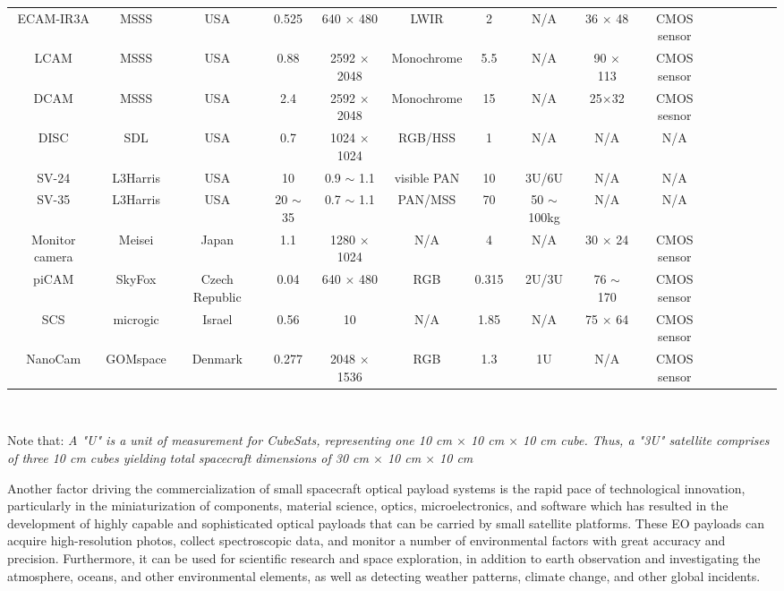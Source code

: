 \documentclass[final,5p,times,sort&compress,twocolumn]{elsarticle}
\begin{document}
\begin{table}
{\begin{tabular}{c c c c c c c c c c c c c c c}
			ECAM-IR3A & MSSS & USA & 0.525 & 640 $\times$ 480 &  LWIR & 2 &  N/A &  36 $\times$ 48 & CMOS sensor  & \cite{malin2023}\\    
			LCAM & MSSS & USA & 0.88 & 2592 $\times$ 2048 &  Monochrome & 5.5 &  N/A &90 $\times$ 113 & CMOS sensor & \cite{malin2023}\\  
			DCAM & MSSS & USA & 2.4 & 2592 $\times$ 2048 & Monochrome & 15 &  N/A & 25$\times$32 & CMOS  sesnor & \cite{malin2023}\\  
			DISC & SDL & USA & 0.7 & 1024 $\times$ 1024 &  RGB/HSS & 1 &  N/A & N/A & N/A & \cite{sdl2023}\\
			SV-24 & L3Harris & USA & 10 & 0.9 $\sim$  1.1 &  visible PAN & 10 & 3U/6U & N/A & N/A & \cite{harris2023}\\
			SV-35 & L3Harris & USA & 20 $\sim$ 35 & 0.7 $\sim$ 1.1 &  PAN/MSS & 70 &  50 $\sim$ 100kg & N/A & N/A & \cite{harris2023}\\
			Monitor camera & Meisei & Japan & 1.1 & 1280 $\times$ 1024 & N/A & 4 & N/A & 30 $\times$ 24 & CMOS sensor &  \cite{meisei2023}\\ 
			piCAM & SkyFox & Czech Republic & 0.04 & 640 $\times$ 480&  RGB & 0.315 &  2U/3U & 76 $\sim$ 170 & CMOS sensor & \cite{skyfox2023}\\ 
			SCS & microgic & Israel & 0.56 & 10 &  N/A & 1.85 &  N/A & 75 $\times$ 64 & CMOS  sensor & \cite{micro2023}\\
			NanoCam  & GOMspace & Denmark & 0.277 & 2048 $\times$ 1536 &  RGB & 1.3 &  1U & N/A & CMOS sensor  & \cite{gomspace2023}\\
			\hline
		\end{tabular}
	}
	\label{table:nonlin} %
	\vspace{1ex}\\
	\raggedright{Note that: \textit{A "U" is a unit of measurement for CubeSats, representing one 10 cm $\times$ 10 cm $\times$ 10 cm cube. Thus, a "3U" satellite comprises of three 10 cm cubes yielding total spacecraft dimensions of 30 cm $\times$ 10 cm $\times$ 10 cm}}
	
\end{table}
Another factor driving the commercialization of small spacecraft optical payload systems is the rapid pace of technological innovation, particularly in the miniaturization of components, material science, optics, microelectronics, and software which has resulted in the development of highly capable and sophisticated optical payloads that can be carried by small satellite platforms. These EO payloads can acquire high-resolution photos, collect spectroscopic data, and monitor a number of environmental factors with great accuracy and precision. Furthermore, it can be used for scientific research and space exploration, in addition to earth observation and investigating the atmosphere, oceans, and other environmental elements, as well as detecting weather patterns, climate change, and other global incidents.\\
\end{document}
